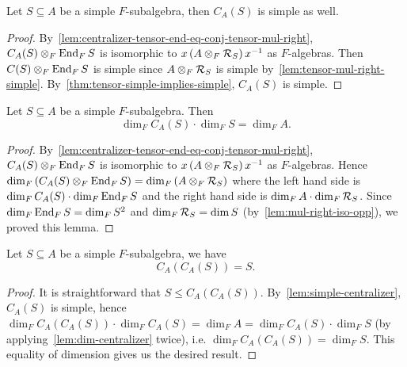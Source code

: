  \begin{lemma}\label{lem:simple-centralizer}
   Let $S\subseteq A$ be a simple $F$-subalgebra, then
   $C_{A}(S)$ is simple as well. \leanok {}
 \end{lemma}

 \begin{proof}
   By~\cref{lem:centralizer-tensor-end-eq-conj-tensor-mul-right},
   $C_{A}(S) \otimes_{F}\operatorname{End}_{F}S$ is isomorphic to
   $x\left(A\otimes_{F}\mathcal{R}_{S}\right)x^{-1}$ as $F$-algebras. Then
   $C(S)\otimes_{F}\operatorname{End}_{F}S$ is simple since $A\otimes_{F}\mathcal{R}_{S}$ is simple
   by~\cref{lem:tensor-mul-right-simple}.
   By~\cref{thm:tensor-simple-implies-simple}, $C_{A}(S)$ is simple.
 \end{proof}

 \begin{lemma}
   \label{lem:dim-centralizer}
   Let $S\subseteq A$ be a simple $F$-subalgebra. Then
   \[
     \dim_{F}C_{A}(S)\cdot\dim_{F}S=\dim_{F}A.
   \]
   \leanok
 \end{lemma}
 \begin{proof}
   By~\cref{lem:centralizer-tensor-end-eq-conj-tensor-mul-right},
   $C_{A}(S) \otimes_{F}\operatorname{End}_{F}S$ is isomorphic to
   $x\left(A\otimes_{F}\mathcal{R}_{S}\right)x^{-1}$ as $F$-algebras. Hence $\dim_{F}\left(C_{A}(S)\otimes_{F}\operatorname{End}_{F}S\right)=\dim_{F}\left(A\otimes_{F}\mathcal{R}_{S}\right)$ where the left hand side is $\dim_{F}C_{A}(S)\cdot \dim_{F}\operatorname{End}_{F}S$ and the right hand side is $\dim_{F}A\cdot\dim_{F}\mathcal{R}_{S}$. Since $\dim_{F}\operatorname{End}_{F}S=\dim_{F}S^{2}$ and $\dim_{F}\mathcal{R}_{S}=\dim S$ (by~\cref{lem:mul-right-iso-opp}), we proved this lemma.
 \end{proof}

 \begin{theorem}\label{thm:double-centralizer}
   Let $S\subseteq A$ be a simple $F$-subalgebra, we have
   \[
     C_{A}\left(C_{A}(S)\right) = S.
   \]
 \end{theorem}
 \begin{proof}
  It is straightforward that $S \le C_{A}\left(C_{A}(S)\right)$. By~\cref{lem:simple-centralizer}, $C_{A}(S)$ is simple, hence $\dim_{F}C_{A}\left(C_{A}(S)\right)\cdot \dim_{F}C_{A}(S)=\dim_{F}A=\dim_{F}C_{A}(S)\cdot \dim_{F}S$ (by applying~\cref{lem:dim-centralizer} twice), i.e. $\dim_{F}C_{A}\left(C_{A}(S)\right) = \dim_{F}S$. This equality of dimension gives us the desired result.
 \end{proof}
 
